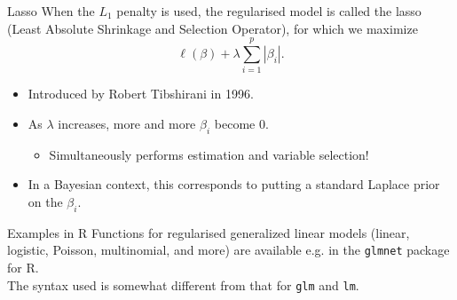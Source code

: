 \documentclass[10pt]{beamer}
\begin{document}
\begin{frame}{Lasso}
When the $L_1$ penalty is used, the regularised model is called the {\color{uured}lasso} (Least Absolute Shrinkage and Selection Operator), for which we maximize
$$\ell(\beta)+\lambda\sum_{i=1}^p|\beta_i|.$$
\begin{itemize}
\item Introduced by Robert Tibshirani in 1996.\\[3mm]\pause
\item As $\lambda$ increases, more and more $\beta_i$ become 0.\pause
\begin{itemize}
\item Simultaneously performs estimation and variable selection!\\[3mm]\pause
\end{itemize}
\item In a Bayesian context, this corresponds to putting a standard Laplace prior on the $\beta_i$.
\end{itemize}
\end{frame}

\begin{frame}{Examples in R}
Functions for regularised generalized linear models (linear, logistic, Poisson, multinomial, and more) are available e.g. in the \texttt{glmnet} package for R.\\[3mm]\pause
The syntax used is somewhat different from that for \texttt{glm} and \texttt{lm}.\\[3mm]
\end{frame}
\end{document}
